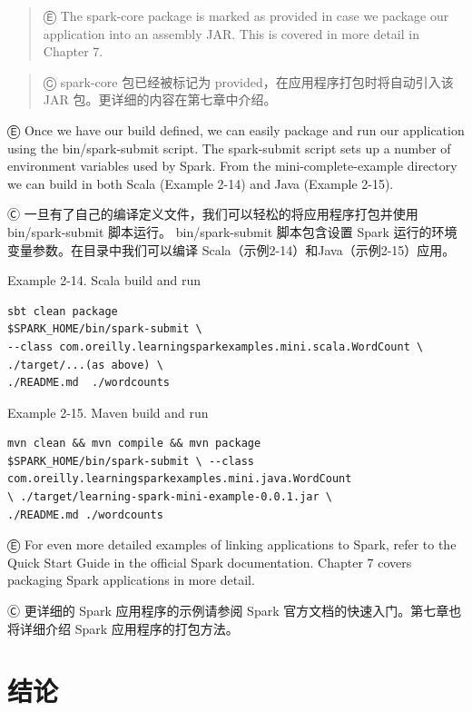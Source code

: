 {{\begin{quote}
Ⓔ \textcolor{etc}{ The spark-core package is marked as provided in case we package our application into an assembly JAR. This is covered in more detail in
Chapter 7. }
\end{quote}

\begin{quote}
Ⓒ spark-core 包已经被标记为 provided，在应用程序打包时将自动引入该 JAR
包。更详细的内容在第七章中介绍。
\end{quote}

Ⓔ \textcolor{etc}{Once we have our build defined, we can easily package and run our application using the bin/spark-submit script. The spark-submit script sets up a number of environment variables used by Spark. From the mini-complete-example directory we can build in both Scala (Example 2-14) and Java (Example 2-15).}

Ⓒ
一旦有了自己的编译定义文件，我们可以轻松的将应用程序打包并使用bin/spark-submit
脚本运行。 bin/spark-submit 脚本包含设置 Spark
运行的环境变量参数。在目录中我们可以编译
Scala（示例2-14）和Java（示例2-15）应用。

Example 2-14. Scala build and run

\begin{lstlisting}
sbt clean package
$SPARK_HOME/bin/spark-submit \
--class com.oreilly.learningsparkexamples.mini.scala.WordCount \
./target/...(as above) \
./README.md  ./wordcounts
\end{lstlisting}

Example 2-15. Maven build and run

\begin{lstlisting}
mvn clean && mvn compile && mvn package
$SPARK_HOME/bin/spark-submit \ --class
com.oreilly.learningsparkexamples.mini.java.WordCount
\ ./target/learning-spark-mini-example-0.0.1.jar \
./README.md ./wordcounts
\end{lstlisting}

Ⓔ \textcolor{etc}{For even more detailed examples of linking applications to Spark, refer to the Quick Start Guide in the official Spark documentation. Chapter 7 covers packaging Spark applications in more detail.}

Ⓒ 更详细的 Spark 应用程序的示例请参阅 Spark
官方文档的快速入门。第七章也将详细介绍 Spark 应用程序的打包方法。

\section{结论}\label{ux7ed3ux8bba}

}}
